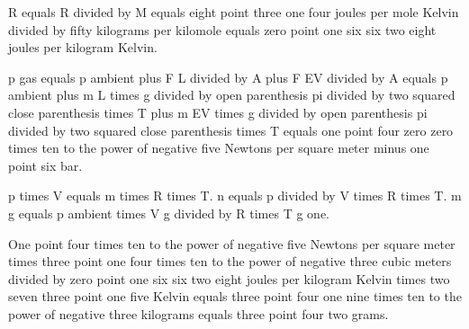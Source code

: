 R equals R divided by M equals eight point three one four joules per mole Kelvin divided by fifty kilograms per kilomole equals zero point one six six two eight joules per kilogram Kelvin.

p gas equals p ambient plus F L divided by A plus F EV divided by A equals p ambient plus m L times g divided by open parenthesis pi divided by two squared close parenthesis times T plus m EV times g divided by open parenthesis pi divided by two squared close parenthesis times T equals one point four zero zero times ten to the power of negative five Newtons per square meter minus one point six bar.

p times V equals m times R times T. n equals p divided by V times R times T. m g equals p ambient times V g divided by R times T g one.

One point four times ten to the power of negative five Newtons per square meter times three point one four times ten to the power of negative three cubic meters divided by zero point one six six two eight joules per kilogram Kelvin times two seven three point one five Kelvin equals three point four one nine times ten to the power of negative three kilograms equals three point four two grams.